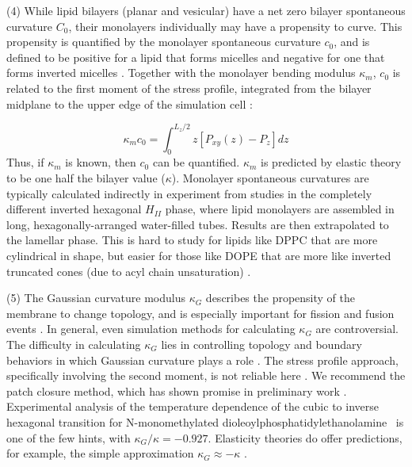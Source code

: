 \documentclass[9pt,bestpractices]{livecoms}
\begin{document}
(4) While lipid bilayers (planar and vesicular) have a net zero bilayer spontaneous curvature $C_0$, their monolayers individually may have a propensity to curve.
This propensity is quantified by the monolayer spontaneous curvature $c_0$, and is defined to be positive for a lipid that forms micelles and negative for one that forms inverted micelles \cite{Venable2015}.
Together with the monolayer bending modulus $\kappa_m$, $c_0$ is related to the first moment of the stress profile, integrated from the bilayer midplane to the upper edge of the simulation cell \cite{Safran1994}:

\begin{equation}\label{eq:10}
	\kappa_m c_0 = \int_{0}^{L_z/2} z[P_{xy}(z) - P_z]dz
\end{equation}
Thus, if $\kappa_m$ is known, then $c_0$ can be quantified.
$\kappa_m$ is predicted by elastic theory to be one half the bilayer value ($\kappa$).
Monolayer spontaneous curvatures are typically calculated indirectly in experiment from studies in the completely different inverted hexagonal $H_{II}$ phase, where lipid monolayers are assembled in long, hexagonally-arranged water-filled tubes.
Results are then extrapolated to the lamellar phase.
This is hard to study for lipids like DPPC that are more cylindrical in shape, but easier for those like DOPE that are more like inverted truncated cones (due to acyl chain unsaturation) \cite{Venable2015,Israelachvili2011}.

(5) The Gaussian curvature modulus $\kappa_G$ describes the propensity of the membrane to change topology, and is especially important for fission and fusion events \cite{Hu2012a}.
In general, even simulation methods for calculating $\kappa_G$ are controversial.
The difficulty in calculating $\kappa_G$ lies in controlling topology and boundary behaviors in which Gaussian curvature plays a role \cite{Hu2012a}.
The stress profile approach, specifically involving the second moment, is not reliable here \cite{Hu2012a,Hu2013}.
We recommend the patch closure method, which has shown promise in preliminary work \cite{Hu2012a}.
Experimental analysis of the temperature dependence of the cubic to inverse hexagonal transition for N-monomethylated dioleoylphosphatidylethanolamine~\cite{Siegel2008} is one of the few hints, with $\kappa_G / \kappa = -0.927$. %
Elasticity theories do offer predictions, for example, the simple approximation $\kappa_G \approx -\kappa$ \cite{Deserno2009,Hu2012a,Ramakrishnan2014c}.
\end{document}

